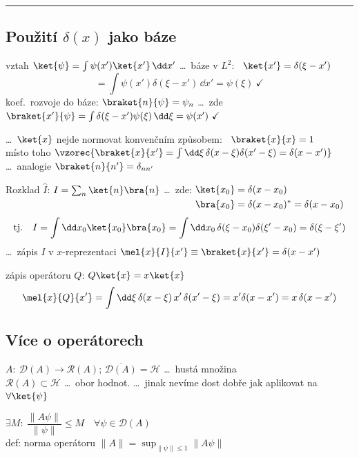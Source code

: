 \noindent\rule{\linewidth}{0.3pt}

\subsection*{Použití $\delta(x)$ jako báze}
vztah \quad $\ket{\psi} = \int\psi(x')\ket{x'}\,\dd x'$ \quad \dots\ báze v $L^2$: \ $\ket{x'} = \delta(\xi - x')$
\[
  = \int\psi(x')\delta(\xi - x')\,\dd x' = \psi(\xi)\ \checkmark
\]
koef.\ rozvoje do báze: $\braket{n}{\psi} = \psi_n$ \quad \dots\ zde \quad
$\braket{x'}{\psi} = \int\delta(\xi - x')\psi(\xi)\,\dd\xi = \psi(x')\ \checkmark$

 \dots\ $\ket{x}$ nejde normovat konvenčním způsobem: \ \sout{$\braket{x}{x} = 1$} \\
místo toho \quad $\vzorec{\braket{x}{x'} = \int\dd\xi\,\delta(x - \xi)\delta(x' - \xi) = \delta(x - x')}$ \\
\quad \dots\ analogie \quad $\braket{n}{n'} = \delta_{nn'}$

Rozklad $\hat I$: \quad $I = \sum_n\ket{n}\bra{n}$ \quad \dots\ zde: \quad
$\begin{aligned}[t]\ket{x_0} &= \delta(x - x_0) \\ \bra{x_0} &= \delta(x - x_0)^* = \delta(x - x_0)\end{aligned}$
\[
  \text{tj.}\quad I = \int\dd x_0\ket{x_0}\bra{x_0} = \int\dd x_0\,\delta(\xi - x_0)\delta(\xi' - x_0) = \delta(\xi - \xi')
\]
\quad \dots\ zápis $I$ v $x$-reprezentaci \quad $\mel{x}{I}{x'} \equiv \braket{x}{x'} = \delta(x - x')$

zápis operátoru $Q$: \quad $Q\ket{x} = x\ket{x}$
\[
  \mel{x}{Q}{x'} = \int\dd\xi\,\delta(x - \xi)\,x'\,\delta(x' - \xi) = x'\delta(x - x') = x\,\delta(x - x')
\]

\subsection*{Více o operátorech}
$A:\ \mathcal{D}(A)\to\mathcal{R}(A)$; \quad $\overline{\mathcal{D}(A)} = \mathcal{H}$ \dots\ hustá množina \\
\quad $\mathcal{R}(A)\subset\mathcal{H}$ \dots\ obor hodnot. \quad \dots\ jinak nevíme dost dobře jak aplikovat na $\forall\ket{\psi}$

\begin{definice}
$\exists M:\ \dfrac{\|A\psi\|}{\|\psi\|} \leq M \quad \forall\psi\in\mathcal{D}(A)$ \\[2pt]
def: norma operátoru \quad $\|A\| = \sup_{\|\psi\|\leq 1}\|A\psi\|$
\end{definice}

